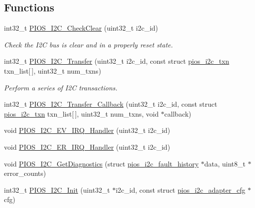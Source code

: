 \subsection*{\-Functions}
\begin{DoxyCompactItemize}
\item 
int32\-\_\-t \hyperlink{group___p_i_o_s___i2_c_gaaabd7d33d122ee5c6b33779b1302a84f}{\-P\-I\-O\-S\-\_\-\-I2\-C\-\_\-\-Check\-Clear} (uint32\-\_\-t i2c\-\_\-id)
\begin{DoxyCompactList}\small\item\em \-Check the \-I2\-C bus is clear and in a properly reset state. \end{DoxyCompactList}\item 
int32\-\_\-t \hyperlink{group___p_i_o_s___i2_c_ga82be0a46a98ad8ed6609e4f2dd27ae46}{\-P\-I\-O\-S\-\_\-\-I2\-C\-\_\-\-Transfer} (uint32\-\_\-t i2c\-\_\-id, const struct \hyperlink{structpios__i2c__txn}{pios\-\_\-i2c\-\_\-txn} txn\-\_\-list\mbox{[}$\,$\mbox{]}, uint32\-\_\-t num\-\_\-txns)
\begin{DoxyCompactList}\small\item\em \-Perform a series of \-I2\-C transactions. \end{DoxyCompactList}\item 
int32\-\_\-t \hyperlink{group___p_i_o_s___i2_c_ga29a3d795901b2ad013a11454cd587e57}{\-P\-I\-O\-S\-\_\-\-I2\-C\-\_\-\-Transfer\-\_\-\-Callback} (uint32\-\_\-t i2c\-\_\-id, const struct \hyperlink{structpios__i2c__txn}{pios\-\_\-i2c\-\_\-txn} txn\-\_\-list\mbox{[}$\,$\mbox{]}, uint32\-\_\-t num\-\_\-txns, void $\ast$callback)
\item 
void \hyperlink{group___p_i_o_s___i2_c_ga779ac2da156f2d9720d8e526bf05edb4}{\-P\-I\-O\-S\-\_\-\-I2\-C\-\_\-\-E\-V\-\_\-\-I\-R\-Q\-\_\-\-Handler} (uint32\-\_\-t i2c\-\_\-id)
\item 
void \hyperlink{group___p_i_o_s___i2_c_ga3039907b5945c06d4c27e756647fa75c}{\-P\-I\-O\-S\-\_\-\-I2\-C\-\_\-\-E\-R\-\_\-\-I\-R\-Q\-\_\-\-Handler} (uint32\-\_\-t i2c\-\_\-id)
\item 
void \hyperlink{group___p_i_o_s___i2_c_ga6a77173f087765671ea1e440471637a5}{\-P\-I\-O\-S\-\_\-\-I2\-C\-\_\-\-Get\-Diagnostics} (struct \hyperlink{structpios__i2c__fault__history}{pios\-\_\-i2c\-\_\-fault\-\_\-history} $\ast$data, uint8\-\_\-t $\ast$error\-\_\-counts)
\item 
int32\-\_\-t \hyperlink{group___p_i_o_s___i2_c_ga10b19295cb30ec2e44c0a11f45cf28fe}{\-P\-I\-O\-S\-\_\-\-I2\-C\-\_\-\-Init} (uint32\-\_\-t $\ast$i2c\-\_\-id, const struct \hyperlink{structpios__i2c__adapter__cfg}{pios\-\_\-i2c\-\_\-adapter\-\_\-cfg} $\ast$cfg)
\end{DoxyCompactItemize}
